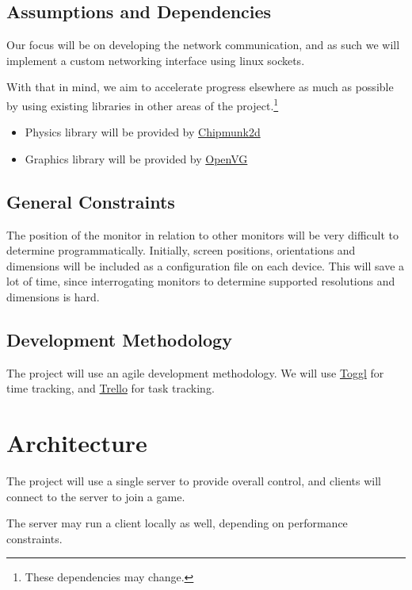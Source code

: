\documentclass[a4paper]{article}
\begin{document}
\subsection{Assumptions and Dependencies}

Our focus will be on developing the network communication, and as such we will
implement a custom networking interface using linux sockets.

With that in mind, we aim to accelerate progress elsewhere as much as possible
by using existing libraries in other areas of the project.\footnote{These
dependencies may change.}

\begin{itemize}
  \item Physics library will be provided by
    \href{http://chipmunk2d.net/}{Chipmunk2d}
  \item Graphics library will be provided by
    \href{http://www.khronos.org/openvg/}{OpenVG}
\end{itemize}

\subsection{General Constraints}

The position of the monitor in relation to other monitors will be very
difficult to determine programmatically. Initially, screen positions,
orientations and dimensions will be included as a configuration file on each
device. This will save a lot of time, since interrogating monitors to
determine supported resolutions and dimensions is hard.

\subsection{Development Methodology}

The project will use an agile development methodology. We will use
\href{https://www.toggl.com/}{Toggl} for time tracking, and 
\href{https://trello.com/}{Trello} for task tracking.

\section{Architecture}

The project will use a single server to provide overall control, and clients
will connect to the server to join a game.

The server may run a client locally as well, depending on performance
constraints.
\end{document}
